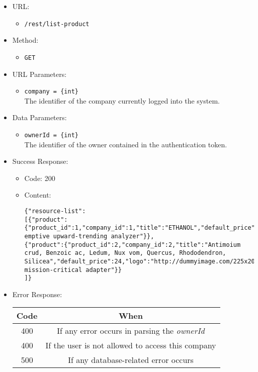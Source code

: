 \begin{itemize}

    \item URL:
    \begin{itemize}
        \item \texttt{/rest/list-product}
    \end{itemize}

    \item Method:
    \begin{itemize}
        \item \texttt{GET}
    \end{itemize}

    \item URL Parameters:
    \begin{itemize}
        \item \texttt{company = \{int\}} \\
        The identifier of the company currently logged into the system.
    \end{itemize}

    \item Data Parameters:
    \begin{itemize}
        \item \texttt{ownerId = \{int\}} \\
        The identifier of the owner contained in the authentication token.
    \end{itemize}

    \item Success Response:
    \begin{itemize}
        \item Code: 200
        \item Content:
        \begin{lstlisting}
{"resource-list":
[{"product":{"product_id":1,"company_id":1,"title":"ETHANOL","default_price":29,"logo":"http://dummyimage.com/222x224.png/5fa2dd/ffffff","measurement_unit":"Kg","description":"Pre-emptive upward-trending analyzer"}},
{"product":{"product_id":2,"company_id":2,"title":"Antimoium crud, Benzoic ac, Ledum, Nux vom, Quercus, Rhododendron, Silicea","default_price":24,"logo":"http://dummyimage.com/225x208.png/5fa2dd/ffffff","measurement_unit":"Kg","description":"Ameliorated mission-critical adapter"}}
]}
        \end{lstlisting}
    \end{itemize}

    \item Error Response:
    \begin{table}[!h]
    \centering
    \begin{tabular}{|c|c|}
    \hline
    \multicolumn{1}{|c|}{\textbf{Code}} & \multicolumn{1}{c|}{\textbf{When}} \\ \hline
    400 & If any error occurs in parsing the \textit{ownerId}  \\\hline
    400 & If the user is not allowed to access this company \\\hline
    500 & If any database-related error occurs \\\hline
    \end{tabular}
    \end{table}


\end{itemize}

